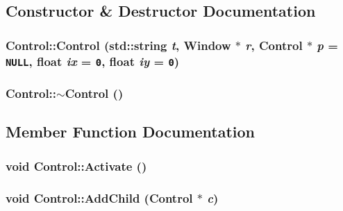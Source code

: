 \subsection{Constructor \& Destructor Documentation}
\hypertarget{class_control_47c96017a04b9fd78e73d7c0cbd397d4}{
\subsubsection[{Control}]{\setlength{\rightskip}{0pt plus 5cm}Control::Control (std::string {\em t}, \/  {\bf Window} $\ast$ {\em r}, \/  {\bf Control} $\ast$ {\em p} = {\tt NULL}, \/  float {\em ix} = {\tt 0}, \/  float {\em iy} = {\tt 0})}}
\label{class_control_47c96017a04b9fd78e73d7c0cbd397d4}


\hypertarget{class_control_edda1328c4f8b8d49bca8f0812d3bfd1}{
\subsubsection[{$\sim$Control}]{\setlength{\rightskip}{0pt plus 5cm}Control::$\sim$Control ()}}
\label{class_control_edda1328c4f8b8d49bca8f0812d3bfd1}




\subsection{Member Function Documentation}
\hypertarget{class_control_85211d42235ce9dd321aa9d027d71bdd}{
\subsubsection[{Activate}]{\setlength{\rightskip}{0pt plus 5cm}void Control::Activate ()}}
\label{class_control_85211d42235ce9dd321aa9d027d71bdd}


\hypertarget{class_control_bb10da20e8fa360c8bd4846a05b782e3}{
\subsubsection[{AddChild}]{\setlength{\rightskip}{0pt plus 5cm}void Control::AddChild ({\bf Control} $\ast$ {\em c})}}
\label{class_control_bb10da20e8fa360c8bd4846a05b782e3}


